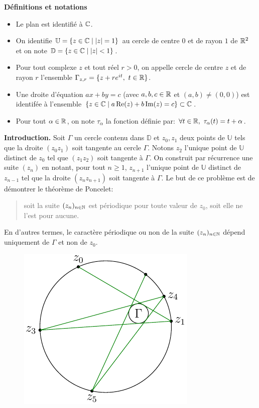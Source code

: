 \noindent \textbf{\large{Définitions et notations}}

\begin{itemize}
\item[\textbullet] Le plan est identifié à $\mathbb{C}$.
\item[\textbullet] On identifie $\mathbb{U} = \{ z\in \mathbb{C} \mid \left\vert z\right\vert = 1\}$ au cercle de centre $0$ et de rayon $1$ de $\mathbb{R}^{2}$ et on note $\mathbb{D} = \{ z\in \mathbb{C} \mid \left\vert z\right\vert  < 1\}$.
\item[\textbullet] Pour tout complexe $z$ et tout réel $r>0$, on appelle cercle de centre $z$ et de rayon $r$ l'ensemble $\Gamma_{z, r} = \{ z + re^{it},\ t\in \R \}$. 
\item[\textbullet] Une droite d'équation $ax + by = c$ (avec $a,b,c\in \mathbb{R}$ et $(a, b)\neq (0, 0)$) est identifée à l'ensemble $\{ z\in \mathbb{C} \mid a\operatorname{Re}(z) + b\operatorname{Im}(z) = c\}\subset \mathbb{C}$. 
\item[\textbullet] Pour tout $\alpha \in \mathbb{R}$, on note $\tau_{\alpha}$ la fonction définie par: $\forall t\in \R,\ \tau_{\alpha}(t) = t + \alpha$.
\end{itemize}

\bigskip


{\bf \large Introduction.} Soit $\Gamma$ un cercle contenu dans $\mathbb{D}$ et $z_{0}, z_{1}$ deux points de $\mathbb{U}$ tels que la droite $(z_{0}z_{1})$ soit tangente au cercle $\Gamma$. Notons $z_{2}$ l'unique point de $\mathbb{U}$ distinct de $z_{0}$ tel que $(z_{1}z_{2})$ soit tangente à $\Gamma$. On construit par récurrence une suite $(z_{n})$ en notant, pour tout $n\geq 1$, $z_{n+1}$ l'unique point de $\mathbb{U}$ distinct de $z_{n-1}$ tel que la droite $(z_{n}z_{n+1})$ soit tangente à $\Gamma$. Le but de ce problème est de démontrer le théorème de Poncelet:
\begin{quotation}
soit la suite $(z_{n})_{n\in \mathbb{N}}$ est périodique pour toute valeur de $z_{0}$, soit elle ne l'est pour aucune.  
\end{quotation} 
En d'autres termes, le caractère périodique ou non de la suite $(z_{n})_{n\in \mathbb{N}}$ dépend uniquement de $\Gamma$ et non de $z_{0}$.

\begin{figure}[h!]
  \centering
  \includegraphics{Eponcelet_1.pdf}
\end{figure}


